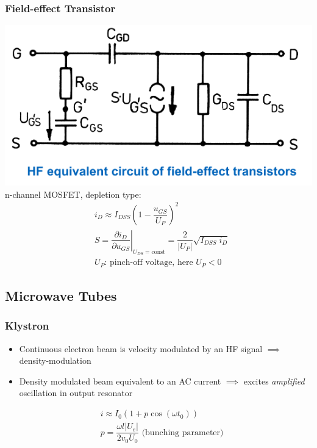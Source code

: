 \subsubsection{Field-effect Transistor}
\includegraphics[width=.3\paperheight]{content/hfcomp/pictures/mosfet_hf_equivalent.png}\\
n-channel MOSFET, depletion type:
\begin{align*}
    &i_D \approx I_{DSS} \left(1 - \dfrac{u_{GS}}{U_P}\right)^2\\
    &S = \left.\dfrac{\partial i_D}{\partial u_{GS}}\right|_{U_{DS}=\mathrm{const}} = \dfrac{2}{|U_P|}\sqrt{I_{DSS} \; i_D}\\
    &U_P\text{: pinch-off voltage, here } U_P < 0
\end{align*}

\subsection{Microwave Tubes}
\subsubsection{Klystron}
\begin{itemize}
    \itemsep0pt
    \item Continuous electron beam is velocity modulated by an HF signal $\implies$ density-modulation
    \item Density modulated beam equivalent to an AC current $\implies$ excites \textit{amplified} oscillation in output resonator
\end{itemize}
\begin{align*}
    &i \approx I_0 \left(1 + p \cos(\omega t_0)\right)\\
    &p = \dfrac{\omega l |U_e|}{2v_0 U_0}\text{ (bunching parameter)}
\end{align*}

